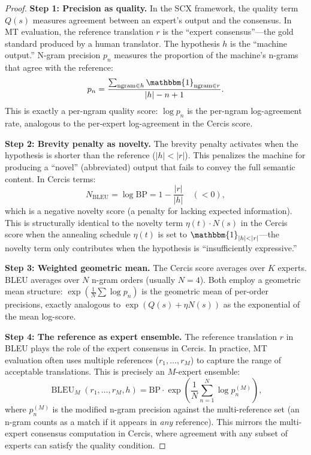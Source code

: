 \documentclass[12pt,a4paper]{article}
\theoremstyle{remark}
\newcommand{\SCX}{\textsf{SCX}}
\newcommand{\Cercis}{\textsf{Cercis}}
\DeclareMathOperator{\BLEU}{BLEU}
\begin{document}
\begin{proof}
\noindent\textbf{Step 1: Precision as quality.}
In the \SCX{} framework, the quality term $Q(s)$ measures agreement
between an expert's output and the consensus. In MT evaluation, the
reference translation $r$ is the ``expert consensus''---the gold
standard produced by a human translator. The hypothesis $h$ is the
``machine output.'' N-gram precision $p_n$ measures the proportion
of the machine's n-grams that agree with the reference:
\begin{equation}
  p_n = \frac{\sum_{\text{ngram} \in h} \mathbbm{1}_{\text{ngram} \in r}}{|h| - n + 1}.
\end{equation}
This is exactly a per-ngram quality score: $\log p_n$ is the
per-ngram log-agreement rate, analogous to the per-expert log-agreement
in the \Cercis{} score.

\smallskip
\noindent\textbf{Step 2: Brevity penalty as novelty.}
The brevity penalty activates when the hypothesis is shorter than
the reference ($|h| < |r|$). This penalizes the machine for
producing a ``novel'' (abbreviated) output that fails to convey
the full semantic content. In \Cercis{} terms:
\begin{equation}
  N_{\text{BLEU}} = \log\text{BP} = 1 - \frac{|r|}{|h|} \quad (< 0),
\end{equation}
which is a negative novelty score (a penalty for lacking expected
information). This is structurally identical to the novelty term
$\eta(t) \cdot N(s)$ in the \Cercis{} score when the annealing
schedule $\eta(t)$ is set to $\mathbbm{1}_{|h| < |r|}$---the
novelty term only contributes when the hypothesis is
``insufficiently expressive.''

\smallskip
\noindent\textbf{Step 3: Weighted geometric mean.}
The \Cercis{} score averages over $K$ experts. BLEU averages over
$N$ n-gram orders (usually $N = 4$). Both employ a geometric mean
structure: $\exp(\frac{1}{N}\sum \log p_n)$ is the geometric mean
of per-order precisions, exactly analogous to $\exp(Q(s) + \eta N(s))$
as the exponential of the mean log-score.

\smallskip
\noindent\textbf{Step 4: The reference as expert ensemble.}
The reference translation $r$ in BLEU plays the role of the expert
consensus in \Cercis{}. In practice, MT evaluation often uses
multiple references ($r_1, \ldots, r_M$) to capture the range of
acceptable translations. This is precisely an $M$-expert ensemble:
\begin{equation}
  \BLEU_M(r_1,\ldots,r_M, h) = \text{BP} \cdot \exp\left(\frac{1}{N}\sum_{n=1}^N \log p_n^{(M)}\right),
\end{equation}
where $p_n^{(M)}$ is the modified n-gram precision against the
multi-reference set (an n-gram counts as a match if it appears
in \emph{any} reference). This mirrors the multi-expert consensus
computation in \Cercis{}, where agreement with any subset of experts
can satisfy the quality condition.
\end{proof}
\end{document}
